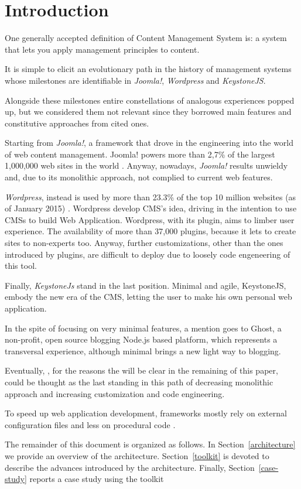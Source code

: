 \section{Introduction}

One generally accepted definition of Content Management System is: a system that lets you apply management principles to content.

It is simple to elicit an evolutionary path in the history of management systems whose milestones are identifiable in \emph{Joomla!}, \emph{Wordpress} and \emph{KeystoneJS}.

Alongside these milestones entire constellations of analogous experiences popped up, but we considered them not relevant since they borrowed main features and constitutive approaches from cited ones. 

Starting from \emph{Joomla!}, a framework that drove in the engineering into the world of web content management. Joomla! powers more than 2,7\% of the largest 1,000,000 web sites in the world \cite{usage-cms}. Anyway, nowadays, \emph{Joomla!} results unwieldy and, due to its monolithic approach, not complied to current web features.

\emph{Wordpress}, instead is used by more than 23.3\% of the top 10 million websites (as of January 2015) \cite{usage-cms}. Wordpress develop CMS’s idea, driving in the intention to use CMSs to build Web Application. Wordpress, with its plugin, aims to limber user experience. The availability of more than 37,000 plugins, because it lets to create sites to non-experts too.
Anyway, further customizations, other than the ones introduced by plugins, are difficult to deploy due to loosely code engeneering of this tool.

Finally, \emph{KeystoneJs} stand in the last position. Minimal and agile, KeystoneJS, embody the new era of the CMS, letting the user to make his own personal web application.

In the spite of focusing on very minimal features, a mention goes to Ghost, a non-profit, open source blogging Node.js based platform, which represents a transversal experience, although minimal brings a new light way to blogging.

Eventually, , for the reasons the will be clear in the remaining of this paper, could be thought as the last standing in this path of decreasing monolithic approach and increasing customization and code engineering.

To speed up web application development, frameworks mostly rely on external configuration files and less on procedural code \cite{6859693}.


The remainder of this document is organized as follows. 
In Section~\ref{architecture} we provide an overview of the  architecture.
Section~\ref{toolkit} is devoted to describe the advances introduced by the
 architecture. 
Finally, Section~\ref{case-study} reports a case study using the toolkit

